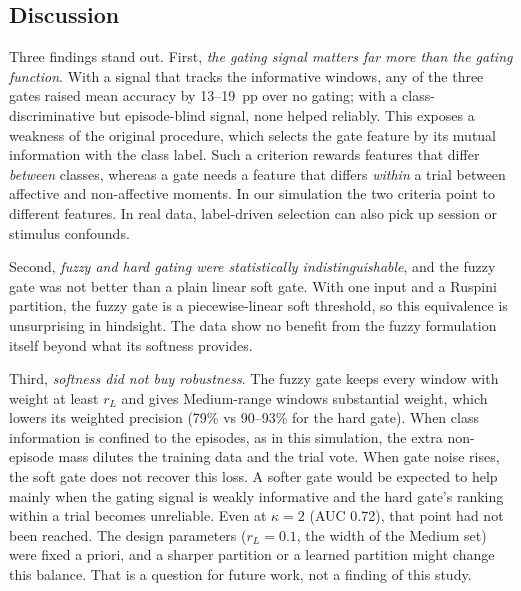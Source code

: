 \begin{table}[t]
\centering\scriptsize
\caption{Earlier baseline (M0) runs on the synthetic data with the original window-level protocol\simnote{} (window accuracy on retained windows, \%, mean $\pm$ SD over 5 folds, 3 fuzzy levels)}\label{tab:prev}
\resizebox{\linewidth}{!}{}
\end{table}

\subsection{Discussion}
Three findings stand out. First, \emph{the gating signal matters far more than the gating function}. With a signal that tracks the informative windows, any of the three gates raised mean accuracy by 13--19~pp over no gating; with a class-discriminative but episode-blind signal, none helped reliably. This exposes a weakness of the original procedure, which selects the gate feature by its mutual information with the class label. Such a criterion rewards features that differ \emph{between} classes, whereas a gate needs a feature that differs \emph{within} a trial between affective and non-affective moments. In our simulation the two criteria point to different features. In real data, label-driven selection can also pick up session or stimulus confounds.

Second, \emph{fuzzy and hard gating were statistically indistinguishable}, and the fuzzy gate was not better than a plain linear soft gate. With one input and a Ruspini partition, the fuzzy gate is a piecewise-linear soft threshold, so this equivalence is unsurprising in hindsight. The data show no benefit from the fuzzy formulation itself beyond what its softness provides.

Third, \emph{softness did not buy robustness}. The fuzzy gate keeps every window with weight at least $r_L$ and gives Medium-range windows substantial weight, which lowers its weighted precision (79\% vs 90--93\% for the hard gate). When class information is confined to the episodes, as in this simulation, the extra non-episode mass dilutes the training data and the trial vote. When gate noise rises, the soft gate does not recover this loss. A softer gate would be expected to help mainly when the gating signal is weakly informative and the hard gate's ranking within a trial becomes unreliable. Even at $\kappa=2$ (AUC 0.72), that point had not been reached. The design parameters ($r_L=0.1$, the width of the Medium set) were fixed a priori, and a sharper partition or a learned partition might change this balance. That is a question for future work, not a finding of this study.

